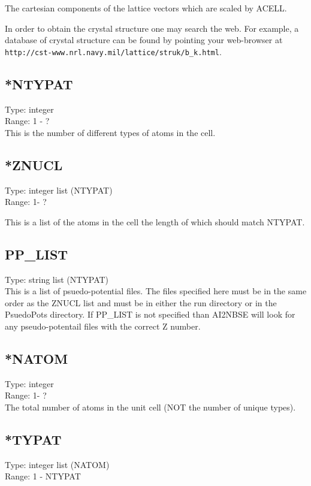 \documentclass[12pt]{revtex4}
\begin{document}
The cartesian components of the lattice vectors which are scaled by ACELL.

In order to obtain the crystal structure one may search the web. For example,
a database of crystal structure can be found by pointing your web-browser at
 \verb|http://cst-www.nrl.navy.mil/lattice/struk/b_k.html|.

\subsection{*NTYPAT}
Type: integer \\
Range: 1 - ? \\

This is the number of different types of atoms in the cell.

\subsection{*ZNUCL}
Type: integer list (NTYPAT) \\
Range: 1- ?

This is a list of the atoms in the cell the length of which should match NTYPAT. 
\subsection{PP\_LIST}
Type: string list (NTYPAT) \\

This is a list of psuedo-potential files. The files specified here must be in the same order as the ZNUCL list and must be in either the run directory or in the PsuedoPots directory. If PP\_LIST is not specified than \textsc{AI2NBSE} will look for any pseudo-potentail files with the correct Z number.


\subsection{*NATOM}
Type: integer \\
Range: 1- ? \\

The total number of atoms in the unit cell (NOT the number of unique types).

\subsection{*TYPAT}
Type: integer list (NATOM) \\
Range: 1 - NTYPAT \\
\end{document}
